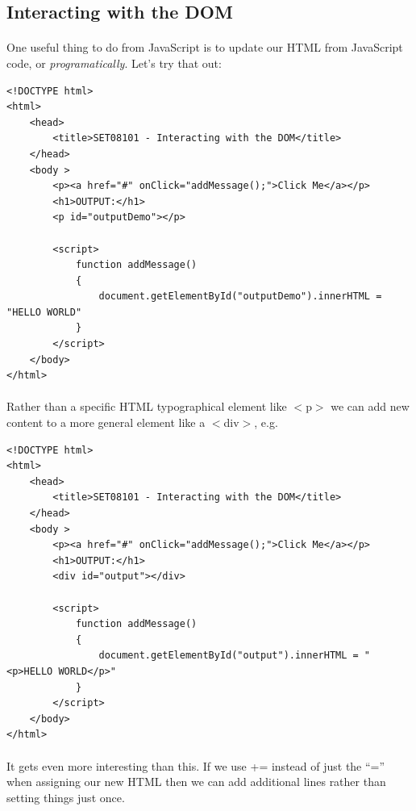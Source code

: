 \documentclass[10pt, a4paper, twosize]{article}
\begin{document}
\subsection{Interacting with the DOM}

\paragraph{} One useful thing to do from JavaScript is to update our HTML from JavaScript code, or \emph{programatically}. Let's try that out:

\begin{lstlisting}
<!DOCTYPE html>
<html>
    <head> 
        <title>SET08101 - Interacting with the DOM</title>
    </head>
    <body >
        <p><a href="#" onClick="addMessage();">Click Me</a></p>
        <h1>OUTPUT:</h1>
        <p id="outputDemo"></p>

        <script>
            function addMessage() 
            { 
                document.getElementById("outputDemo").innerHTML = "HELLO WORLD"
            }      
        </script>
    </body>
</html>
\end{lstlisting}

\paragraph{} Rather than a specific HTML typographical element like $<$p$>$ we can add new content to a more general element like a $<$div$>$, e.g.

\begin{lstlisting}
<!DOCTYPE html>
<html>
    <head> 
        <title>SET08101 - Interacting with the DOM</title>
    </head>
    <body >
        <p><a href="#" onClick="addMessage();">Click Me</a></p>
        <h1>OUTPUT:</h1>
        <div id="output"></div>

        <script>
            function addMessage() 
            { 
                document.getElementById("output").innerHTML = "<p>HELLO WORLD</p>"
            }      
        </script>
    </body>
</html>
\end{lstlisting}

\paragraph{} It gets even more interesting than this. If we use += instead of just the ``='' when assigning our new HTML then we can add additional lines rather than setting things just once. 
\end{document}

